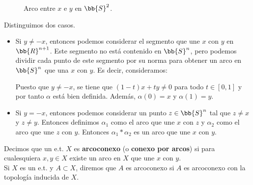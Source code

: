 \begin{ejemplo}
\begin{enumerate}
\begin{figure}
            \caption{Arco entre $x$ e $y$ en $\bb{S}^2$.}
            \label{fig:arcos_s2}
        \end{figure}

        Distinguimos dos casos.
        \begin{itemize}
            \item Si $y\neq -x$, entonces podemos considerar el segmento que une $x$ con $y$ en $\bb{R}^{n+1}$. Este segmento no está contenido en $\bb{S}^n$, pero podemos dividir cada punto de este segmento por su norma para obtener un arco en $\bb{S}^n$ que una $x$ con $y$. Es decir, consideramos:

            Puesto que $y\neq -x$, se tiene que $(1-t)x + ty \neq 0$ para todo $t\in [0,1]$ y por tanto $\alpha$ está bien definida. Además, $\alpha(0) = x$ y $\alpha(1) = y$.

            \item Si $y=-x$, entonces podemos considerar un punto $z\in \bb{S}^n$ tal que $z\neq x$ y $z\neq y$. Entonces definimos $\alpha_1$ como el arco que une $x$ con $z$ y $\alpha_2$ como el arco que une $z$ con $y$. Entonces $\alpha_1\ast \alpha_2$ es un arco que une $x$ con $y$.
        \end{itemize}
    \end{enumerate}
\end{ejemplo}

\begin{definicion}
    Decimos que un e.t. $X$ es \textbf{arcoconexo} (o \textbf{conexo por arcos}) si para cualesquiera $x,y\in X$ existe un arco en $X$ que une $x$ con $y$.\\

    Si $X$ es un e.t. y $A\subset X$, diremos que $A$ es arcoconexo si $A$ es arcoconexo con la topología inducida de $X$.
\end{definicion}


